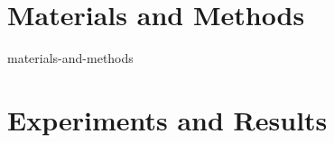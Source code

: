 \documentclass[
12pt,				%
openright,			%
twoside,			%
a4paper,			%
oldfontcommands,
chapter=TITLE,		%
section=TITLE,		%
french,				%
spanish,			%
brazil, 
english				%
]{abntex2}
\begin{document}
	
	

	\part{Materials and Methods}{materials-and-methods}

	
	
	

	\part{Experiments and Results}\label{experiments-and-results}

	


	
	
	\postextual
	
	
	
	
	
	
 	\begin{apendicesenv}
       	
 		\partapendices
 		
       	
 	\end{apendicesenv}
	
	
	
	\printindex
	
\end{document}

